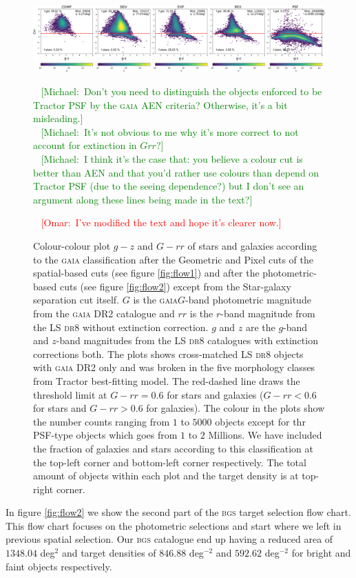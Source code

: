 \documentclass[fleqn,usenatbib]{mnras}
\newcommand{\mike}[1]{~\newline\noindent \textcolor{Green}{{ [Michael:~{#1}]\\}}}
\newcommand{\omar}[1]{~\newline\noindent \textcolor{red}{{ [Omar:~{#1}]\\}}}
\newcommand{\BGS}{\textsc{bgs}\xspace}
\newcommand{\DReight}{\textsc{dr8}\xspace}
\newcommand{\GAIA}{\textsc{gaia}\xspace}
\newcommand{\TRACTOR}{\textsc{T}ractor\xspace}
\begin{document}
\begin{figure}
	\includegraphics[width=19cm]{images/gz_Grr_bgsbutsg_hexbin}
    \caption{Colour-colour plot $g-z$ and $G-rr$ of stars and galaxies according to the \GAIA classification after the Geometric and Pixel cuts of the spatial-based cuts (see  figure \ref{fig:flow1}) and after the photometric-based cuts (see figure \ref{fig:flow2}) except from the Star-galaxy separation cut itself. $G$ is the \GAIA $G$-band photometric magnitude from the \GAIA DR2 catalogue and $rr$ is the $r$-band magnitude from the LS \DReight without extinction correction. $g$ and $z$ are the $g$-band and $z$-band magnitudes from the LS \DReight catalogues with extinction corrections both. The plots shows cross-matched LS \DReight objects with \GAIA DR2 only and was broken in the five morphology classes from \TRACTOR best-fitting model. The red-dashed line draws the threshold limit at $G-rr = 0.6$ for stars and galaxies ($G-rr < 0.6$ for stars and $G-rr > 0.6$ for galaxies). The colour in the plots show the number counts ranging from $1$ to $5000$ objects except for thr PSF-type objects which goes from $1$ to $2$ Millions. We have included the fraction of galaxies and stars according to this classification at the top-left corner and bottom-left corner respectively. The total amount of objects within each plot and the target density is at top-right corner.}

    \mike{Don't you need to distinguish the objects enforced to be \TRACTOR PSF by the \GAIA AEN criteria?  Otherwise, it's a bit misleading.}
    \mike{It's not obvious to me why it's more correct to not account for extinction in $Grr$?}
    \mike{I think it's the case that:  you believe a colour cut is better than AEN and that you'd rather use colours than depend on \TRACTOR PSF (due to the seeing dependence?) but I don't see an argument along these lines being made in the text?}
    
\omar{I've modified the text and hope it's clearer now.}
    \label{fig:Grr-gz}
\end{figure}

In figure \ref{fig:flow2}  we show the second part of the \BGS target selection flow chart. This flow chart focuses on the photometric selections and start where we left in previous spatial selection. Our \BGS catalogue end up having a reduced area of $1348.04$ deg$^{2}$ and target densities of $846.88$ deg$^{-2}$ and $592.62$ deg$^{-2}$ for bright and faint objects respectively. 
\end{document}

